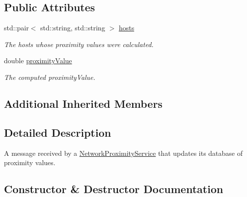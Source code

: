\subsection*{Public Attributes}
\begin{DoxyCompactItemize}
\item 
\mbox{\label{classwrench_1_1_network_proximity_compute_answer_message_addb794ffc7be64710ae8d9753bcd87f2}} 
std\+::pair$<$ std\+::string, std\+::string $>$ \hyperlink{classwrench_1_1_network_proximity_compute_answer_message_addb794ffc7be64710ae8d9753bcd87f2}{hosts}
\begin{DoxyCompactList}\small\item\em The hosts whose proximity values were calculated. \end{DoxyCompactList}\item 
\mbox{\label{classwrench_1_1_network_proximity_compute_answer_message_ae584ad27ef0f865f78284e5d45c4b863}} 
double \hyperlink{classwrench_1_1_network_proximity_compute_answer_message_ae584ad27ef0f865f78284e5d45c4b863}{proximity\+Value}
\begin{DoxyCompactList}\small\item\em The computed proximity\+Value. \end{DoxyCompactList}\end{DoxyCompactItemize}
\subsection*{Additional Inherited Members}


\subsection{Detailed Description}
A message received by a \hyperlink{classwrench_1_1_network_proximity_service}{Network\+Proximity\+Service} that updates its database of proximity values. 

\subsection{Constructor \& Destructor Documentation}
\mbox{\label{classwrench_1_1_network_proximity_compute_answer_message_af3313e0c1a8b09232997b787eaaa1dc4}} 
